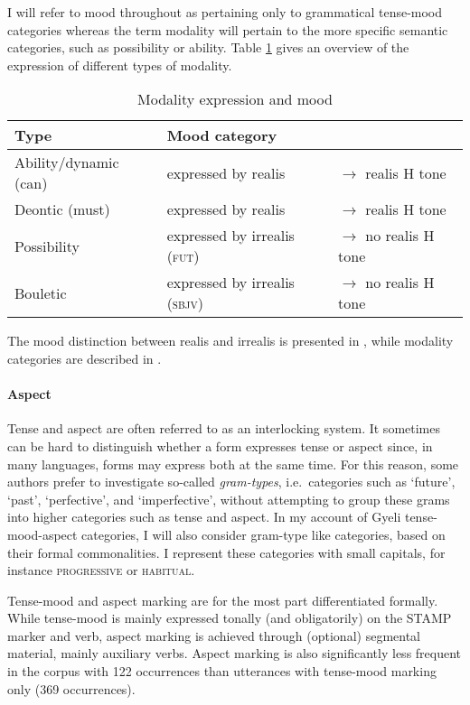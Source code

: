 \fi

I will refer to mood throughout as pertaining only to grammatical tense-mood categories whereas the term modality  will pertain to the more specific semantic categories, such as possibility or ability. Table \ref{Tab:Modality} gives an overview of the expression of different types of modality. 

\begin{table}
\centering
\begin{tabular}{l|ll}
Type & Mood category &  \\
 \midrule
Ability/dynamic (can) & expressed by realis & $\rightarrow$ realis  H tone \\
Deontic (must) & expressed by realis & $\rightarrow$ realis  H tone  \\
Possibility  & expressed by irrealis (\textsc{fut}) & $\rightarrow$ no realis  H tone \\
Bouletic & expressed by irrealis (\textsc{sbjv})  & $\rightarrow$ no realis  H tone \\
\end{tabular}
\caption{Modality expression and mood}
\label{Tab:Modality}
\end{table}

The mood distinction between realis and irrealis is presented in , while modality categories are described in .

\paragraph{Aspect}
Tense and aspect are often referred to as an interlocking system. It sometimes can be hard to distinguish whether a form expresses tense or aspect since, in many languages, forms may express both at the same time. For this reason, some authors \citep{dahl85, bybee94} prefer to investigate so-called {\itshape gram-types}, i.e.\ categories such as `future', `past', `perfective', and `imperfective', without attempting to group these grams into higher categories such as tense and aspect.
In my account of Gyeli tense-mood-aspect categories, I will also consider gram-type like categories, based on their formal commonalities. I represent these categories with small capitals, for instance \textsc{progressive} or \textsc{habitual}.

Tense-mood and aspect marking are for the most part differentiated formally. While tense-mood is mainly expressed tonally (and obligatorily) on the STAMP marker and verb, aspect marking is achieved through (optional) segmental material, mainly auxiliary verbs.
Aspect marking is also significantly less frequent in the corpus with 122 occurrences than utterances with tense-mood marking only (369 occurrences).  


